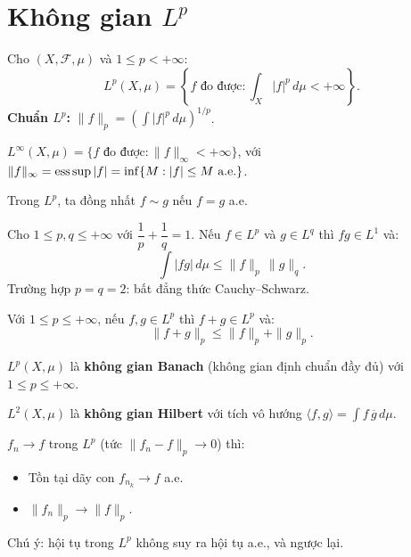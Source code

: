 \documentclass[12pt,a4paper]{article}
\begin{document}
\section{Không gian $L^p$}

\begin{dinhnghia}
  Cho $(X, \mathcal{F}, \mu)$ và $1 \le p < +\infty$:
  \[
    L^p(X, \mu) = \left\{f \text{ đo được} : \int_X |f|^p\,d\mu < +\infty\right\}.
  \]
  \textbf{Chuẩn $L^p$:} $\|f\|_p = \left(\displaystyle\int |f|^p\,d\mu\right)^{1/p}$.

  $L^\infty(X, \mu) = \{f \text{ đo được} : \|f\|_\infty < +\infty\}$, với $\|f\|_\infty = \text{ess\,sup}\,|f| = \inf\{M : |f| \le M \text{ a.e.}\}$.

  Trong $L^p$, ta đồng nhất $f \sim g$ nếu $f = g$ a.e.
\end{dinhnghia}

\begin{dinhly}[title={Bất đẳng thức Hölder}]
  Cho $1 \le p, q \le +\infty$ với $\dfrac{1}{p} + \dfrac{1}{q} = 1$. Nếu $f \in L^p$ và $g \in L^q$ thì $fg \in L^1$ và:
  \[
    \int |fg|\,d\mu \le \|f\|_p\,\|g\|_q.
  \]
  Trường hợp $p = q = 2$: bất đẳng thức Cauchy--Schwarz.
\end{dinhly}

\begin{dinhly}[title={Bất đẳng thức Minkowski}]
  Với $1 \le p \le +\infty$, nếu $f, g \in L^p$ thì $f + g \in L^p$ và:
  \[
    \|f + g\|_p \le \|f\|_p + \|g\|_p.
  \]
\end{dinhly}

\begin{dinhly}[title={Tính đầy đủ (Riesz--Fischer)}]
  $L^p(X, \mu)$ là \textbf{không gian Banach} (không gian định chuẩn đầy đủ) với $1 \le p \le +\infty$.

  $L^2(X, \mu)$ là \textbf{không gian Hilbert} với tích vô hướng $\langle f, g \rangle = \displaystyle\int f\,\overline{g}\,d\mu$.
\end{dinhly}

\begin{dinhly}[title={Hội tụ trong $L^p$}]
  $f_n \to f$ trong $L^p$ (tức $\|f_n - f\|_p \to 0$) thì:
  \begin{itemize}
    \item Tồn tại dãy con $f_{n_k} \to f$ a.e.
    \item $\|f_n\|_p \to \|f\|_p$.
  \end{itemize}
  Chú ý: hội tụ trong $L^p$ không suy ra hội tụ a.e., và ngược lại.
\end{dinhly}
\end{document}
